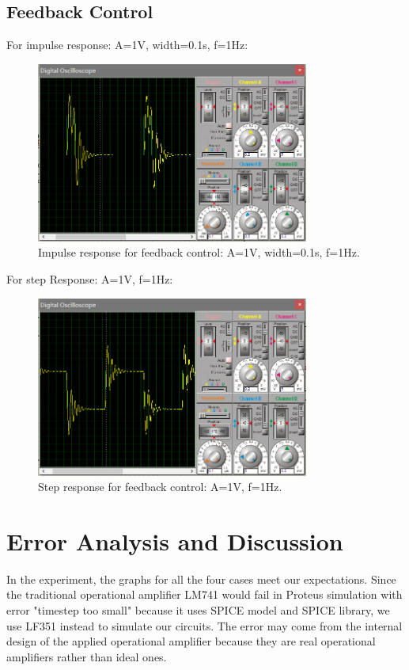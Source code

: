 \documentclass[a4paper]{article}
\begin{document}
\subsection{Feedback Control}
For impulse response: A=1V, width=0.1s, f=1Hz:
\begin{figure}[H]
    \begin{center}
        \includegraphics[width=0.8\textwidth]{11.png}
    \end{center}
    \caption{Impulse response for feedback control: A=1V, width=0.1s, f=1Hz.}
\end{figure}
For step Response: A=1V, f=1Hz:
\begin{figure}[H]
    \begin{center}
        \includegraphics[width=0.8\textwidth]{12.png}
    \end{center}
    \caption{Step response for feedback control: A=1V, f=1Hz.}
\end{figure}
\section{Error Analysis and Discussion}
In the experiment, the graphs for all the four cases meet our expectations. Since the traditional operational amplifier LM741 would fail in Proteus simulation with error "timestep too small" because it uses SPICE model and SPICE library, we use LF351 instead to simulate our circuits. The error may come from the internal design of the applied operational amplifier because they are real operational amplifiers rather than ideal ones.
\end{document}
